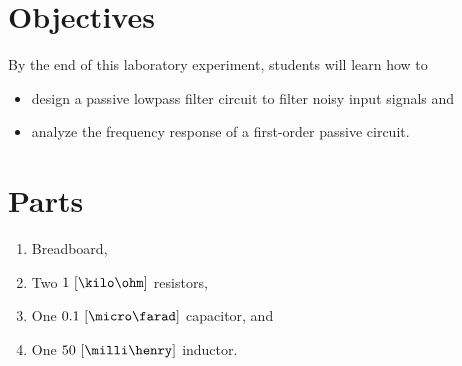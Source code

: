 \section{Objectives}
By the end of this laboratory experiment, students will learn how to 

\begin{itemize}
\item design a passive lowpass filter circuit to filter noisy input signals and 
  
\item analyze the frequency response of a first-order passive circuit.  

\end{itemize}

\section{Parts}
\label{sec:parts}

\begin{enumerate}  
\item Breadboard,
\item Two $1~[\kilo\ohm]$ resistors,  
\item One $0.1~[\micro\farad]$ capacitor, and
\item One $50~[\milli\henry]$ inductor.
  
\end{enumerate}


